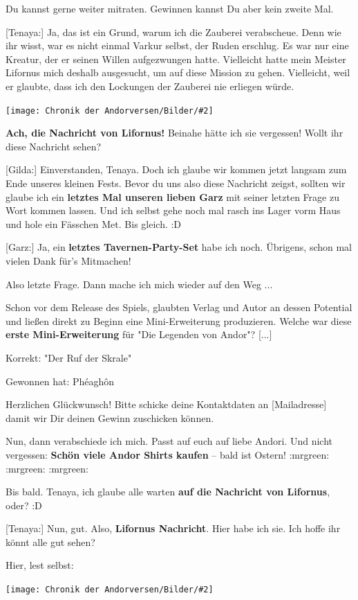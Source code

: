 \documentclass[10pt, a4paper, oneside]{book}
\newcommand{\bildmitts}[2][height=0.32\textwidth,width=0.48\textwidth,keepaspectratio]{%
    \begin{center}
        \texttt{[image: Chronik der Andorversen/Bilder/\#2]}
    \end{center}
}
\begin{document}
\begin{multicols}{2}
Du kannst gerne weiter mitraten. Gewinnen kannst Du aber kein zweite Mal.

[Tenaya:] Ja, das ist ein Grund, warum ich die Zauberei verabscheue. Denn wie ihr wisst, war es nicht einmal Varkur selbst, der Ruden erschlug. Es war nur eine Kreatur, der er seinen Willen aufgezwungen hatte. Vielleicht hatte mein Meister Lifornus mich deshalb ausgesucht, um auf diese Mission zu gehen. Vielleicht, weil er glaubte, dass ich den Lockungen der Zauberei nie erliegen würde. 

\bildmitts{AA2022 Tavernen-Party 9.jpeg}

\textbf{Ach, die Nachricht von Lifornus!} Beinahe hätte ich sie vergessen!
Wollt ihr diese Nachricht sehen?

[Gilda:] Einverstanden, Tenaya. Doch ich glaube wir kommen jetzt langsam zum Ende unseres kleinen Fests. Bevor du uns also diese Nachricht zeigst, sollten wir glaube ich ein \textbf{letztes Mal unseren lieben Garz} mit seiner letzten Frage zu Wort kommen lassen. Und ich selbst gehe noch mal rasch ins Lager vorm Haus und hole ein Fässchen Met. Bis gleich. :D

[Garz:] Ja, ein \textbf{letztes Tavernen-Party-Set} habe ich noch.
Übrigens, schon mal vielen Dank für's Mitmachen!

Also letzte Frage. Dann mache ich mich wieder auf den Weg ...

Schon vor dem Release des Spiels, glaubten Verlag und Autor an dessen Potential und ließen direkt zu Beginn eine Mini-Erweiterung produzieren. Welche war diese \textbf{erste Mini-Erweiterung} für "Die Legenden von Andor"? [...] 

Korrekt: "Der Ruf der Skrale"

Gewonnen hat: Phéaghôn

Herzlichen Glückwunsch! Bitte schicke deine Kontaktdaten an [Mailadresse] damit wir Dir deinen Gewinn zuschicken können.

Nun, dann verabschiede ich mich. Passt auf euch auf liebe Andori. Und nicht vergessen: \textbf{Schön viele Andor Shirts kaufen} – bald ist Ostern! :mrgreen: :mrgreen: :mrgreen:

Bis bald. Tenaya, ich glaube alle warten \textbf{auf die Nachricht von Lifornus}, oder? :D 

[Tenaya:] Nun, gut. Also, \textbf{Lifornus Nachricht}. Hier habe ich sie. Ich hoffe ihr könnt alle gut sehen?

Hier, lest selbst:

\bildmitts{AA2022 Tavernen-Party 10.jpeg}


\end{multicols}
\end{document}
